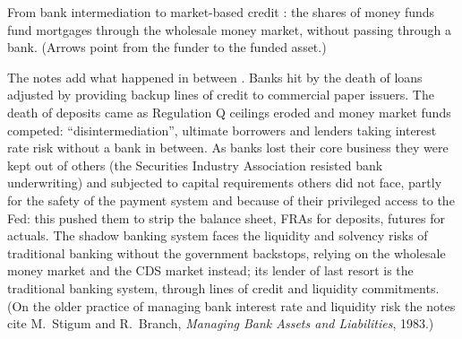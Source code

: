 \begin{paracol}{2}
\begin{nfigure}
\caption{From bank intermediation to market-based credit : the shares of money funds fund mortgages through the wholesale money market, without passing
through a bank. (Arrows point from the funder to the funded asset.)}\label{fig:bl-shadow}
\end{nfigure}

The notes add what happened in between . Banks hit by the death of loans adjusted by providing backup lines of credit to commercial paper issuers. The
death of deposits came as Regulation Q ceilings eroded and money market funds competed: ``disintermediation'', ultimate borrowers and lenders taking interest rate risk without a bank
in between. As banks lost their core business they were kept out of others (the Securities Industry Association resisted bank underwriting) and subjected to capital requirements
others did not face, partly for the safety of the payment system and because of their privileged access to the Fed: this pushed them to strip the balance sheet, FRAs for deposits,
futures for actuals. The shadow banking system faces the liquidity and solvency risks of traditional banking without the government backstops, relying on the wholesale money market
and the CDS market instead; its lender of last resort is the traditional banking system, through lines of credit and liquidity commitments. (On the older practice of managing bank
interest rate and liquidity risk the notes cite M.~Stigum and R.~Branch, \emph{Managing Bank Assets and Liabilities}, 1983.)


\end{paracol}
